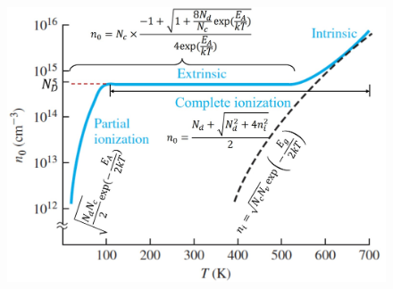 \documentclass{beamer}
\begin{document}
    \begin{frame} \frametitle{}
        \begin{figure}[H]
            \centering
            \includegraphics[width=0.95\linewidth]{n0-versus-T.jpg}
            \label{fig:n0-versus-T-0.jpg}
        \end{figure}
    \end{frame}
\end{document}
